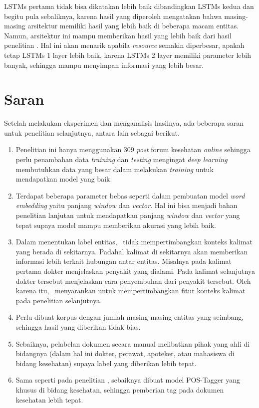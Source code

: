 LSTMs pertama tidak bisa dikatakan lebih baik dibandingkan LSTMs kedua dan begitu pula sebaliknya, karena hasil yang diperoleh mengatakan bahwa masing-masing arsitektur memiliki hasil yang lebih baik di beberapa macam entitas. Namun, arsitektur ini mampu memberikan hasil yang lebih baik dari hasil penelitian \cite{skripsiKakRadit}. Hal ini akan menarik apabila \textit{resource} semakin diperbesar, apakah tetap LSTMs 1 layer lebih baik, karena LSTMs 2 layer memiliki parameter lebih banyak, sehingga mampu menyimpan informasi yang lebih besar.

\section{Saran}
Setelah melakukan eksperimen dan menganalisis hasilnya, ada beberapa saran untuk penelitian selanjutnya, antara lain sebagai berikut.

\begin{enumerate}
  \item Penelitian ini hanya menggunakan 309 \textit{post} forum kesehatan \textit{online} sehingga perlu penambahan data \textit{training} dan \textit{testing} mengingat \textit{deep learning} membutuhkan data yang besar dalam melakukan \textit{training} untuk mendapatkan model yang baik.
  
  \item Terdapat beberapa parameter bebas seperti dalam pembuatan model \textit{word embedding} yaitu panjang \textit{window} dan \textit{vector}. Hal ini bisa menjadi bahan penelitian lanjutan untuk mendapatkan panjang \textit{window} dan \textit{vector} yang tepat supaya model mampu memberikan akurasi yang lebih baik.
  
  \item Dalam menentukan label entitas, \saya~tidak mempertimbangkan konteks kalimat yang berada di sekitarnya. Padahal kalimat di sekitarnya akan memberikan informasi lebih terkait hubungan antar entitas. Misalnya pada kalimat pertama dokter menjelaskan penyakit yang dialami. Pada kalimat selanjutnya dokter tersebut menjelaskan cara penyembuhan dari penyakit tersebut. Oleh karena itu, \saya~menyarankan untuk mempertimbangkan fitur konteks kalimat pada penelitian selanjutnya.
  

  \item Perlu dibuat korpus dengan jumlah masing-masing entitas yang seimbang, sehingga hasil yang diberikan tidak bias.
  
  \item Sebaiknya, pelabelan dokumen secara manual melibatkan pihak yang ahli di bidangnya (dalam hal ini dokter, perawat, apoteker, atau mahasiswa di bidang kesehatan) supaya label yang diberikan lebih tepat.
  
  \item Sama seperti pada penelitian \cite{skripsiKakRadit}, sebaiknya dibuat model POS-Tagger yang khusus di bidang kesehatan, sehingga pemberian tag pada dokumen kesehatan lebih tepat.

\end{enumerate}